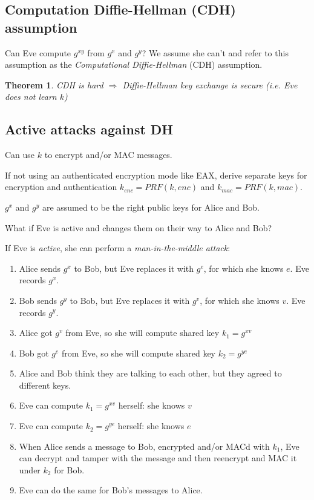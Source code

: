 \documentclass[12pt]{article}
\newtheorem{thm}{Theorem}[section]
\begin{document}
\subsection{Computation Diffie-Hellman (CDH) assumption}
Can Eve compute $g^{xy}$ from $g^x$ and $g^y$? We assume she can't and
refer to this assumption as the \emph{Computational Diffie-Hellman} (CDH)
assumption.

\begin{thm}
CDH is hard $\Rightarrow$ Diffie-Hellman key exchange is secure (i.e.
Eve does not learn $k$)
\end{thm}

\subsection{Active attacks against DH}

\begin{note}
Can use $k$ to encrypt and/or MAC messages.
\end{note}

\begin{note}
If not using an authenticated encryption mode like EAX, derive separate keys
for encryption and authentication $k_{enc} = PRF(k, enc)$ and $k_{mac} = PRF(k, mac)$.
\end{note}

\begin{note}
$g^x$ and $g^y$ are assumed to be the right public keys for Alice and Bob.
\end{note}

What if Eve is active and changes them on their way to Alice and Bob?

If Eve is \emph{active}, she can perform a \emph{man-in-the-middle attack}:

\begin{enumerate}
  \item Alice sends $g^x$ to Bob, but Eve replaces it with $g^e$, for which she
  knows $e$. Eve records $g^x$.
  \item Bob sends $g^y$ to Bob, but Eve replaces it with $g^v$, for which she
  knows $v$. Eve records $g^y$.
  \item Alice got $g^v$ from Eve, so she will compute shared key $k_1 = g^{xv}$
  \item Bob got $g^e$ from Eve, so she will compute shared key $k_2 = g^{ye}$
  \item Alice and Bob think they are talking to each other, but they agreed to
  different keys.
  \item Eve can compute $k_1 = g^{xv}$ herself: she knows $v$
  \item Eve can compute $k_2 = g^{ye}$ herself: she knows $e$
  \item When Alice sends a message to Bob, encrypted and/or MACd with $k_1$, Eve
  can decrypt and tamper with the message and then reencrypt and MAC it under $k_2$
  for Bob.
  \item Eve can do the same for Bob's messages to Alice.
\end{enumerate}
\end{document}
